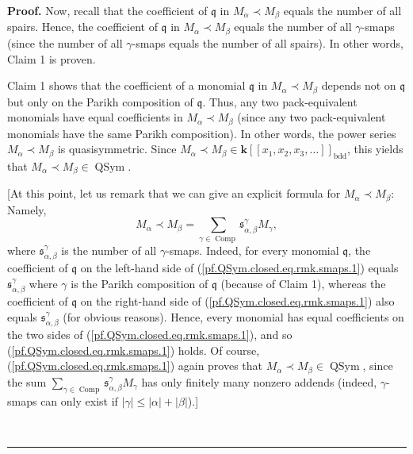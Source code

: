 \documentclass[numbers=enddot,12pt,final,onecolumn,notitlepage,abstracton]{scrartcl}%
\theoremstyle{definition}
\newenvironment{proof}[1][Proof]{\noindent\textbf{#1.} }{\ \rule{0.5em}{0.5em}}
\newenvironment{verlong}{}{}
\let\sumnonlimits\sum
\renewcommand{\sum}{\sumnonlimits\limits}
\begin{document}
\begin{proof}
\begin{verlong}
Now, recall that the coefficient of $\mathfrak{q}$ in $M_{\alpha}\left.
\prec\right.  M_{\beta}$ equals the number of all spairs. Hence, the
coefficient of $\mathfrak{q}$ in $M_{\alpha}\left.  \prec\right.  M_{\beta}$
equals the number of all $\gamma$-smaps (since the number of all $\gamma
$-smaps equals the number of all spairs). In other words, Claim 1 is proven.
\end{verlong}

Claim 1 shows that the coefficient of a monomial $\mathfrak{q}$ in $M_{\alpha
}\left.  \prec\right.  M_{\beta}$ depends not on $\mathfrak{q}$ but only on
the Parikh composition of $\mathfrak{q}$. Thus, any two pack-equivalent
monomials have equal coefficients in $M_{\alpha}\left.  \prec\right.
M_{\beta}$ (since any two pack-equivalent monomials have the same Parikh
composition). In other words, the power series $M_{\alpha}\left.
\prec\right.  M_{\beta}$ is quasisymmetric. Since $M_{\alpha}\left.
\prec\right.  M_{\beta}\in\mathbf{k}\left[  \left[  x_{1},x_{2},x_{3}%
,\ldots\right]  \right]  _{\operatorname*{bdd}}$, this yields that $M_{\alpha
}\left.  \prec\right.  M_{\beta}\in\operatorname*{QSym}$.

[At this point, let us remark that we can give an explicit formula for
$M_{\alpha}\left.  \prec\right.  M_{\beta}$: Namely,%
\begin{equation}
M_{\alpha}\left.  \prec\right.  M_{\beta}=\sum_{\gamma\in\operatorname*{Comp}%
}\mathfrak{s}_{\alpha,\beta}^{\gamma}M_{\gamma},
\label{pf.QSym.closed.eq.rmk.smaps.1}%
\end{equation}
where $\mathfrak{s}_{\alpha,\beta}^{\gamma}$ is the number of all $\gamma
$-smaps. Indeed, for every monomial $\mathfrak{q}$, the coefficient of
$\mathfrak{q}$ on the left-hand side of (\ref{pf.QSym.closed.eq.rmk.smaps.1})
equals $\mathfrak{s}_{\alpha,\beta}^{\gamma}$ where $\gamma$ is the Parikh
composition of $\mathfrak{q}$ (because of Claim 1), whereas the coefficient of
$\mathfrak{q}$ on the right-hand side of (\ref{pf.QSym.closed.eq.rmk.smaps.1})
also equals $\mathfrak{s}_{\alpha,\beta}^{\gamma}$ (for obvious reasons).
Hence, every monomial has equal coefficients on the two sides of
(\ref{pf.QSym.closed.eq.rmk.smaps.1}), and so
(\ref{pf.QSym.closed.eq.rmk.smaps.1}) holds. Of course,
(\ref{pf.QSym.closed.eq.rmk.smaps.1}) again proves that $M_{\alpha}\left.
\prec\right.  M_{\beta}\in\operatorname*{QSym}$, since the sum $\sum
_{\gamma\in\operatorname*{Comp}}\mathfrak{s}_{\alpha,\beta}^{\gamma}M_{\gamma
}$ has only finitely many nonzero addends (indeed, $\gamma$-smaps can only
exist if $\left\vert \gamma\right\vert \leq\left\vert \alpha\right\vert
+\left\vert \beta\right\vert $).]


\end{proof}
\end{document}
